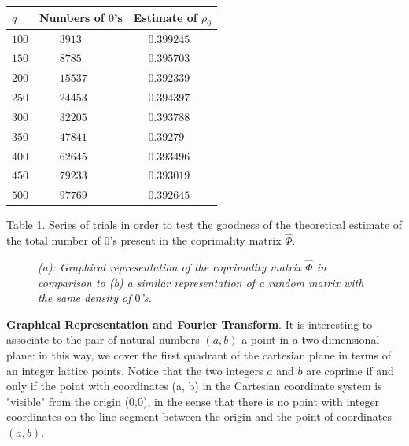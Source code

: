 \documentclass[aps,pra,superscriptaddress]{revtex4}
\renewcommand{\(}{\left(}
\renewcommand{\)}{\right)}
\renewcommand{\[}{\left[}
\renewcommand{\]}{\right]}
\begin{document}
\begin{table}[b]\label{pifre}
\begin{center}
\begin{tabular}{|l|l|l|} \hline 
$q$ & Numbers of $0$'s & Estimate of $\rho_0$ \\
\hline \hline
$100 $ & \,\,\,\,\,\,\,\,\,\,\,$3913$ &  \,\,\,\,\,\,\,\,$ 0.399245$ \\
$ 150$ & \,\,\,\,\,\,\,\,\,\,\,$ 8785$ &  \,\,\,\,\,\,\,\,$ 0.395703$ \\
$ 200$ & \,\,\,\,\,\,\,\,\,\,\,$ 15537$ &  \,\,\,\,\,\,\,\,$0.392339 $ \\
$ 250$ & \,\,\,\,\,\,\,\,\,\,\,$24453 $ &  \,\,\,\,\,\,\,\,$0.394397$ \\
$ 300$ & \,\,\,\,\,\,\,\,\,\,\,$ 32205$ &  \,\,\,\,\,\,\,\,$0.393788 $ \\
$ 350$ & \,\,\,\,\,\,\,\,\,\,\,$ 47841$ &  \,\,\,\,\,\,\,\,$ 0.39279$ \\
$ 400$ & \,\,\,\,\,\,\,\,\,\,\,$ 62645$ &  \,\,\,\,\,\,\,\,$0.393496 $ \\
$ 450$ & \,\,\,\,\,\,\,\,\,\,\,$79233 $ &  \,\,\,\,\,\,\,\,$0.393019$ \\
$ 500$ & \,\,\,\,\,\,\,\,\,\,\,$ 97769$ &  \,\,\,\,\,\,\,\,$0.392645 $ \\
\hline 
\end{tabular} 
\end{center}
Table 1. Series of trials in order to test the goodness of the theoretical estimate of the total number of $0$'s present in the 
coprimality matrix $\widehat\Phi$. 
\end{table}
\vspace{1mm}

\begin{figure}[t]
\caption{{\em (a): Graphical representation of the coprimality matrix $\widehat\Phi$ in comparison to (b) a similar representation of a random 
matrix with the same density of $0$'s.}}
\label{comparison}
\end{figure}



\vspace{3mm}
\noindent
{\bf Graphical Representation and Fourier Transform}. 
It is interesting to associate to the pair of natural numbers $(a,b)$ a point in a two dimensional plane: in this way, we cover the first quadrant of the cartesian plane in terms of an integer lattice points. Notice that the two integers $a$ and $b$ are coprime if and only if the point with coordinates (a, b) in the Cartesian coordinate system is "visible" from the origin (0,0), in the sense that there is no point with integer coordinates on the line segment between the origin and the point of coordinates $(a, b)$. 
\end{document}
